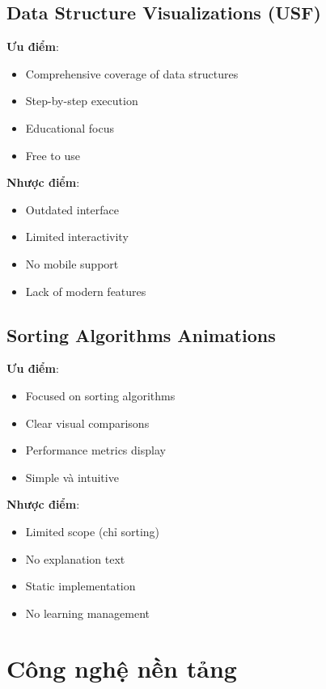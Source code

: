 \subsection{Data Structure Visualizations (USF)}
\label{subsec:usf-dsv}

\textbf{Ưu điểm}:
\begin{itemize}
    \item Comprehensive coverage of data structures
    \item Step-by-step execution
    \item Educational focus
    \item Free to use
\end{itemize}

\textbf{Nhược điểm}:
\begin{itemize}
    \item Outdated interface
    \item Limited interactivity
    \item No mobile support
    \item Lack of modern features
\end{itemize}

\subsection{Sorting Algorithms Animations}
\label{subsec:sorting-animations}

\textbf{Ưu điểm}:
\begin{itemize}
    \item Focused on sorting algorithms
    \item Clear visual comparisons
    \item Performance metrics display
    \item Simple và intuitive
\end{itemize}

\textbf{Nhược điểm}:
\begin{itemize}
    \item Limited scope (chỉ sorting)
    \item No explanation text
    \item Static implementation
    \item No learning management
\end{itemize}

\section{Công nghệ nền tảng}
\label{sec:foundation-technologies}

